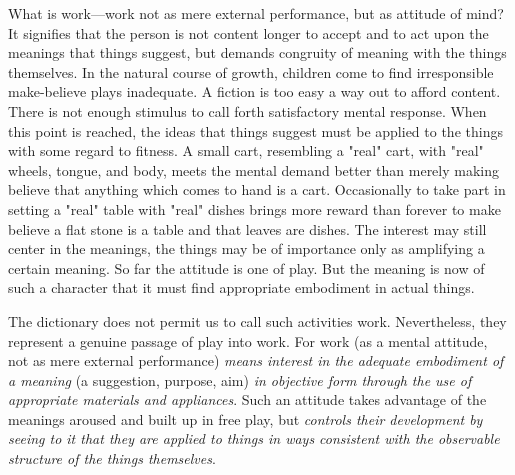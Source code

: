 \documentclass[letterpaper]{book}
\begin{document}

What is work---work not as mere external
performance,
but as attitude of mind? It signifies that the person is not content
longer to accept and to act upon the meanings that things suggest, but
demands congruity of meaning with the things themselves. In the natural
course of growth, children come to find irresponsible make-believe plays
inadequate. A fiction is too easy a way out to afford content. There is
not enough stimulus to call forth satisfactory mental response. When
this point is reached, the ideas that things suggest must be applied to
the things with some regard to fitness. A small cart, resembling a
"real" cart, with "real" wheels, tongue, and body, meets the mental
demand better than merely making believe that anything which comes to
hand is a cart. Occasionally to take part in setting a "real" table with
"real" dishes brings more reward than forever to make believe a flat
stone is a table and that leaves are dishes. The interest may still
center in the meanings, the things may be of importance only as
amplifying a certain meaning. So far the attitude is one of play. But
the meaning is now of such a character that it must find appropriate
embodiment in actual things.

The dictionary does not permit us to call such activities work.
Nevertheless, they represent a genuine passage of play into work. For
work (as a mental attitude, not as mere external performance)
\emph{means interest in the adequate embodiment of a meaning} (a
suggestion, purpose, aim) \emph{in objective form through the use of
appropriate materials and appliances}. Such an attitude takes advantage
of the meanings aroused and built up in free play, but \emph{controls
their development by seeing to it that they are applied to things in
ways consistent with the observable structure of the things
themselves}.

\end{document}
